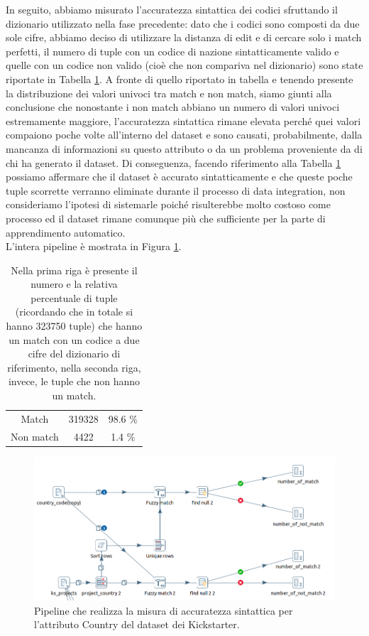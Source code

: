 In seguito, abbiamo misurato l'accuratezza sintattica dei codici sfruttando il dizionario utilizzato nella fase precedente: dato che i codici sono composti da due sole cifre, abbiamo deciso di utilizzare la distanza di edit e di cercare solo i match perfetti, il numero di tuple con un codice di nazione sintatticamente valido e quelle con un codice non valido (cioè che non compariva nel dizionario) sono state riportate in Tabella \ref{tab:code_country_compl}.
A fronte di quello riportato in tabella e tenendo presente la distribuzione dei valori univoci tra match e non match, siamo giunti alla conclusione che nonostante i non match abbiano un numero di valori univoci estremamente maggiore, l'accuratezza sintattica rimane elevata perché quei valori compaiono poche volte all'interno del dataset e sono causati, probabilmente, dalla mancanza di informazioni su questo attributo o da un problema proveniente da di chi ha generato il dataset. 
Di conseguenza, facendo riferimento alla Tabella \ref{tab:code_country_compl} possiamo affermare che il dataset è accurato sintatticamente e che queste poche tuple scorrette verranno eliminate durante il processo di data integration, non consideriamo l'ipotesi di sistemarle poiché risulterebbe molto costoso come processo ed il dataset rimane comunque più che sufficiente per la parte di apprendimento automatico.\\
L'intera pipeline è mostrata in Figura \ref{fig:dqaccuratezzacodicenazioni}.

\begin{table}
	\caption{Nella prima riga è presente il numero e la relativa percentuale di tuple (ricordando che in totale si hanno 323750 tuple) che hanno un match con un codice a due cifre del dizionario di riferimento, nella seconda riga, invece, le tuple che non hanno un match.}
	
	\label{tab:code_country_compl}
	
	\centering
	\begin{tabular}{c|cc}
		Match & 319328 & 98.6 \% \\ 
		Non match & 4422 & 1.4 \% \\
	\end{tabular}
\end{table} 

\begin{figure}
	\centering
	\includegraphics[width=0.7\linewidth]{images/DQ_accuratezzacodicenazioni}
	\caption{Pipeline che realizza la misura di accuratezza sintattica per l'attributo Country del dataset dei Kickstarter.}
	\label{fig:dqaccuratezzacodicenazioni}
\end{figure}


